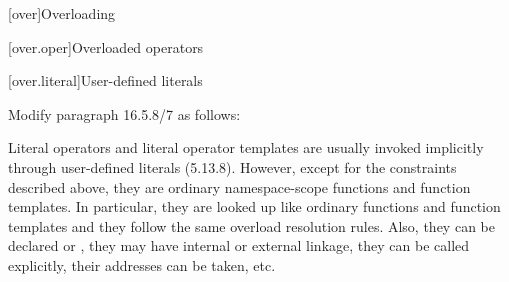 
\setcounter{chapter}{15}
[over]{Overloading}

\setcounter{section}{4}
[over.oper]{Overloaded operators}

\setcounter{subsection}{7}
[over.literal]{User-defined literals}

\noindent
Modify paragraph 16.5.8/7 as follows:
\begin{std.txt}
    \resetalinea[6]
    \alinea
    \enternote
    Literal operators and literal operator templates are usually invoked 
    implicitly through user-defined literals (5.13.8). However, except for 
    the constraints described above, they are ordinary namespace-scope 
    functions and function templates. In particular, they are looked up 
    like ordinary functions and function templates and they follow the same 
    overload resolution rules. Also, they can be declared 
     or , 
    they may have internal or external linkage, they can be called explicitly, 
    their addresses can be taken, etc.
    \exitnote
\end{std.txt}
